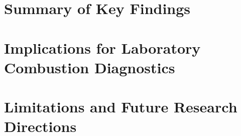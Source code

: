 
\section{Summary of Key Findings}
\label{sec:conc_summary}

\section{Implications for Laboratory Combustion Diagnostics}
\label{sec:conc_implications}

\section{Limitations and Future Research Directions}
\label{sec:conc_future}
